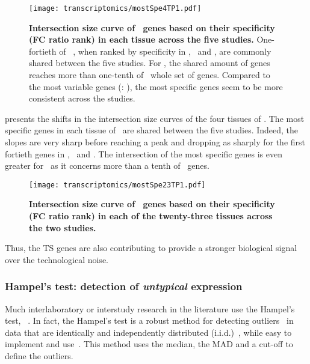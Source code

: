 \begin{figure}[!ht]
    \texttt{[image: transcriptomics/mostSpe4TP1.pdf]}\centering
    \caption[Intersection size curve of \setOne\ genes based on their FC ratio
    rank in each tissue across the five studies]{\label{fig:mostSpe4T}\textbf{Intersection
    size curve of \setOne\ genes based on their specificity (FC ratio rank)
    in each tissue across the five studies.}
    One-fortieth of \setOne\ \pcgs,
    when ranked by specificity in \heart, \kidney\ and \liver,
    are commonly shared between the five studies.
    For \testis, the shared amount of genes reaches more than one-tenth of \setOne\
    whole set of genes.
    Compared to the most variable genes (:
    ),
    the most specific genes seem to be more consistent across the studies.
    }
\end{figure}

 presents the shifts in the intersection size curves of the
four tissues of \setOne.
The most specific genes in each tissue of \setOne\ are shared between the
five studies.
Indeed, the slopes are very sharp before reaching a peak and dropping as sharply
for the first fortieth genes in \heart, \kidney\ and \liver.
The intersection of the most specific genes is even greater for \testis\ as
it concerns more than a tenth of \setOne\ genes.

\begin{figure}[!ht]
    \texttt{[image: transcriptomics/mostSpe23TP1.pdf]}\centering
    \caption[Intersection size curve of \setTwo\ genes based on their FC ratio
    rank in each tissue across the two studies]{\label{fig:mostSpe23T}\textbf{Intersection
    size curve of \setTwo\ genes based on their specificity (FC ratio rank)
    in each of the twenty-three tissues across the two studies.}
    }
\end{figure}

Thus, the \gls{TS} genes are also contributing to provide a stronger
biological signal over the technological noise.

\subsubsection{Hampel's test: detection of \emph{untypical} expression}\label{subsub:Hampel}

Much interlaboratory or interstudy research in the literature use the Hampel's test,
\eg~\cite{LinsingerHampel,Lewczuk2006-wq,Rocke1983-qa,Apfalter1999-ca}.
In fact, the Hampel's test is a robust method
for detecting outliers~
in data that are identically and independently distributed (i.i.d.)~,
while easy to implement and use~\mycite{LinsingerHampel}.
This method uses the median, the \gls{MAD} and a cut-off to define the outliers.

